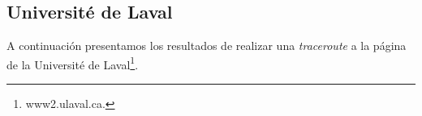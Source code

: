 \subsection{Université de Laval}

A continuación presentamos los resultados de realizar una \textit{traceroute} a la página de la Université de Laval\footnote{www2.ulaval.ca.}.

